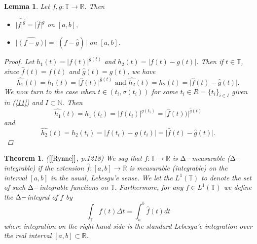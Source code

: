 \documentclass[12pt,a4paper,oneside,titlepage]{article}
\newtheorem{Twierdzenie}{Theorem}
\newtheorem{Lemat}{Lemma}
\begin{document}
\begin{Lemat} \label{Rozszerzenia} Let $f,g : \mathbb{T} \rightarrow \mathbb{R}$. Then 
\begin{itemize}
\item[$(a)$] $\widehat{\vert f \vert^{g}}= \vert \widehat{f} \vert^{\widehat{g}}$ on $ [a,b],$
\item[$(b)$] $\vert \widehat{(f-g)} \vert = \vert (\widehat{f}-\widehat{g})   \vert$  on $ [a,b]$.
\end{itemize}
\begin{proof}
Let $h_1(t)=\vert f(t) \vert^{g(t)}$ and $h_{2}(t)= \vert f(t) - g(t) \vert $. Then  if $t \in \mathbb{T}$, since $\widehat{f}(t)=f(t)$ and $\widehat{g}(t)=g(t)$, we have
\begin{equation}
\nonumber
\widehat{h_1}(t)=h_1(t)= \vert\widehat{f}(t) \vert^{\widehat{g}(t)} \text{ and } \widehat{h_2}(t)=h_2(t)=\vert \widehat{f}(t) - \widehat{g}(t) \vert .
\end{equation}
We now turn to the case when $ t \in (t_i, \sigma(t_i))$ for some $t_i \in R=\lbrace t_i \rbrace_{i \in I}$ given in (\ref{11}) and $I \subset \mathbb{N}$. Then
\begin{equation}
\nonumber
\widehat{h_1}(t)=h_1(t_i)= \vert f(t_i) \vert^{{g}(t_i)} = \vert \widehat{f}(t)) \vert^{\widehat{g}(t)}
\end{equation}
and
\begin{equation}
\nonumber
\widehat{h_2}(t)=h_2(t_i)= \vert f(t_i) - g(t_i) \vert = \vert \widehat{f}(t) - \widehat{g}(t) \vert.
\end{equation} 
\end{proof}
\end{Lemat}

\begin{Twierdzenie} ($[\ref{Rynne}]$, p.1218) We say that $f: \mathbb{T} \rightarrow \mathbb{R}$ is $\Delta \-- $measurable ($\Delta \-- $integrable) if the extension $\widehat{f}: [a,b] \rightarrow \mathbb{R}$ is measurable (integrable) on the interval $[a,b]$ in the usual, Lebesgu'e sense. We let the $L^{1}(\mathbb{T})$ to denote the set of such $\Delta \-- $integrable functions on $\mathbb{T}$. Furthermore, for any $f \in L^{1}(\mathbb{T})$ we define the $\Delta \-- $integral of $f$ by  
\begin{equation}
\label{calkaRozsz}
\int_{\mathbb{T}} f(t) \Delta t = \int_{a}^{b} \widehat{f}(t)dt  
\end{equation}
where integration on the right-hand side is the standard Lebesgu'e integration over the real interval $[a,b] \subset \mathbb{R}$.

\end{Twierdzenie} 
\end{document}
